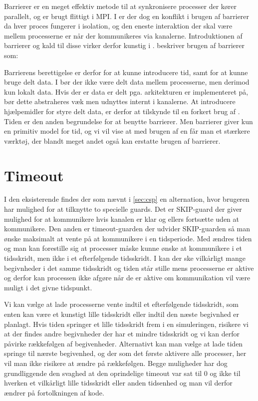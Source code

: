 Barrierer er en meget effektiv metode til at synkronisere processer der kører 
parallelt, og er brugt flittigt i MPI. I \csp er der dog en konflikt i brugen 
af barrierer da hver proces fungerer i isolation, og den eneste interaktion der 
skal være mellem processerne er når der kommunikeres via kanalerne. 
Introduktionen af barrierer og kald til disse virker derfor kunstig i \csp. 
\citeauthor{crew} beskriver brugen af barrierer som:


Barrierens berettigelse er derfor for at kunne introducere tid, samt for at kunne bruge delt data. I \csp bør der ikke være delt data mellem processerne, men derimod kun  lokalt data. Hvis der er data er delt pga. arkitekturen \csp er implementeret på, bør dette abstraheres væk men udnyttes internt i kanalerne. At introducere hjælpemidler for styre delt data, er derfor at tilskynde til en forkert brug af \csp. Tiden er den anden begrundelse for at benytte barrierer.
Men barrierer giver kun en  primitiv model for tid, og vi vil vise at med brugen af en \des får man et stærkere værktøj, der blandt meget andet også kan erstatte brugen af barrierer.

\section{Timeout} 
I den eksisterende \pycsp findes der som nævnt i \cref{sec:csp} en alternation, hvor brugeren har mulighed for at tilknytte to specielle guards. Det er SKIP-guard der giver mulighed for at kommunikere hvis kanalen er klar og ellers fortsætte uden at kommunikere. Den anden er timeout-guarden der udvider SKIP-guarden så man ønske maksimalt at vente på at kommunikere i en tidsperiode. Med \des ændres tiden og man kan forestille sig at processer måske kunne ønske at kommunikere i et tidsskridt, men ikke i et efterfølgende tidsskridt. I \des kan der ske vilkårligt mange begivnheder i det samme tidsskridt og tiden står stille mens processerne er aktive og derfor kan processen ikke afgøre når de er aktive om kommunikation vil være muligt i det givne tidspunkt.

Vi kan vælge at lade processerne vente indtil et efterfølgende tidsskridt, som enten kan være et kunstigt lille tidsskridt eller indtil den næste begivnhed er planlagt.
Hvis tiden springer et lille  tidsskridt frem  i en simuleringen, risikere vi at der findes andre begivnheder der har et mindre tidsskridt og vi kan derfor påvirke rækkefølgen af begivenheder. 
Alternativt kan man vælge at lade tiden springe til nærste begivenhed, og der som det første aktivere alle processer, her vil man ikke risikere at ændre på rækkefølgen.
Begge muligheder har dog grundliggende den svaghed at den oprindelige timeout var sat til
0 og ikke til hverken et vilkårligt lille tidsskridt eller anden
tidsenhed og man vil derfor ændrer på fortolkningen af kode. 

